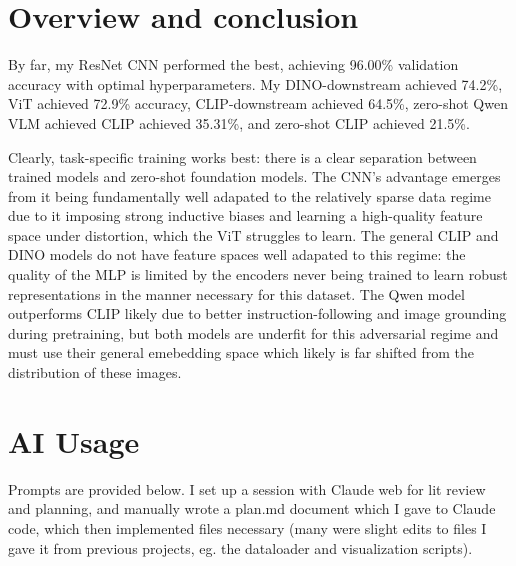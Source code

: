 \documentclass[11pt]{article}
\begin{document}
\section{Overview and conclusion}

By far, my ResNet CNN performed the best, achieving 96.00\% validation accuracy with optimal hyperparameters. My DINO-downstream achieved 74.2\%, ViT achieved 72.9\% accuracy, CLIP-downstream achieved 64.5\%, zero-shot Qwen VLM achieved CLIP achieved 35.31\%, and zero-shot CLIP achieved 21.5\%. 

Clearly, task-specific training works best: there is a clear separation between trained models and zero-shot foundation models. The CNN's advantage emerges from it being fundamentally well adapated to the relatively sparse data regime due to it imposing strong inductive biases and learning a high-quality feature space under distortion, which the ViT struggles to learn. The general CLIP and DINO models do not have feature spaces well adapated to this regime: the quality of the MLP is limited by the encoders never being trained to learn robust representations in the manner necessary for this dataset. The Qwen model outperforms CLIP likely due to better instruction-following and image grounding during pretraining, but both models are underfit for this adversarial regime and must use their general emebedding space which likely is far shifted from the distribution of these images. 





\appendix
\section{AI Usage}

Prompts are provided below. I set up a session with Claude web for lit review and planning, and manually wrote a plan.md document which I gave to Claude code, which then implemented files necessary (many were slight edits to files I gave it from previous projects, eg. the dataloader and visualization scripts).
\end{document}
